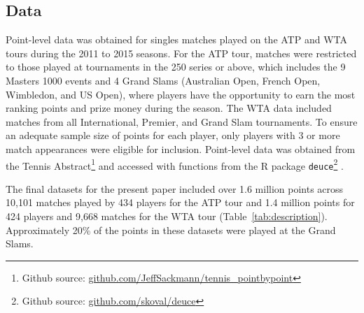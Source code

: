 \documentclass{Latex/svjour3}
\begin{document}
\subsection{Data}

Point-level data was obtained for singles matches played on the ATP and WTA
tours during the 2011 to 2015 seasons. For the ATP tour, matches were restricted
to those played at tournaments in the 250 series or above, which includes the 9
Masters 1000 events and 4 Grand Slams (Australian Open, French Open, Wimbledon,
and US Open), where players have the opportunity to earn the most ranking points
and prize money during the season. The WTA data included matches from all
International, Premier, and Grand Slam tournaments. To ensure an adequate sample
size of points for each player, only players with 3 or more match appearances
were eligible for inclusion. Point-level data was obtained from the Tennis
Abstract\footnote{Github source:
  \url{github.com/JeffSackmann/tennis_pointbypoint}} and accessed with functions
from the R package \texttt{deuce}\footnote{Github source:
  \url{github.com/skoval/deuce}} .

The final datasets for the present paper included over 1.6 million points across
10,101 matches played by 434 players for the ATP tour and 1.4 million points for
424 players and 9,668 matches for the WTA tour
(Table~\ref{tab:description}). Approximately 20\% of the points in these
datasets were played at the Grand Slams.
\end{document}

